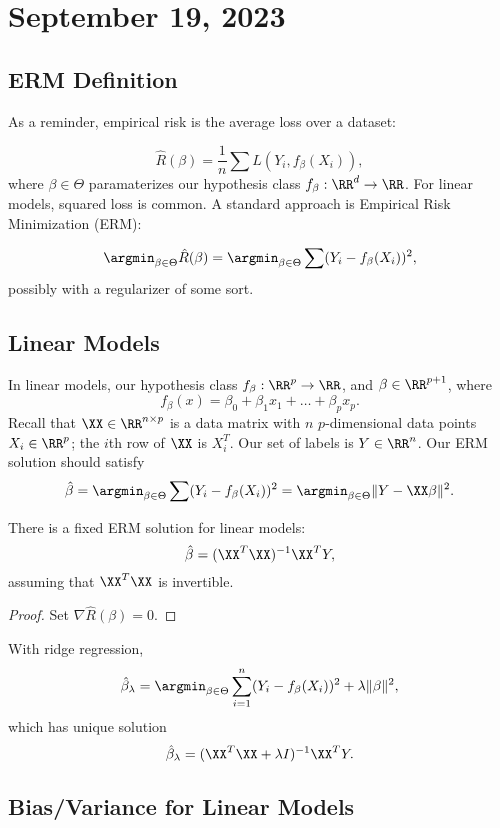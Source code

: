 \section{September 19, 2023}

\subsection{ERM Definition}

As a reminder, \ac{empirical risk} is the average loss over a dataset: 

\[\hat{R}(\beta) = \frac{1}{n}\sum L(Y_i, f_{\beta}(X_i)),\]
where $\beta\in \Theta$ paramaterizes our hypothesis class $f_{\beta}: \RR^d\rightarrow \RR$. For linear models, squared loss is common. A standard approach is Empirical Risk Minimization (ERM): 

\[\argmin_{\beta\in \Theta} \hat{R}(\beta) = \argmin_{\beta\in \Theta}\sum (Y_i - f_{\beta}(X_i))^2,\] 
possibly with a regularizer of some sort. 

\subsection{Linear Models}

In linear models, our hypothesis class $f_{\beta}: \RR^p\rightarrow \RR$, and $\beta\in \RR^{p+1}$, where 
\[f_{\beta}(x) = \beta_0 + \beta_1x_1 + \hdots + \beta_px_p.\]
Recall that $\XX\in \RR^{n\times p}$ is a data matrix with $n$ $p$-dimensional data points $X_i\in \RR^{p}$; the $i$th row of $\XX$ is $X_i^T$. Our set of labels is $Y\in \RR^n$. Our ERM solution should satisfy
\[\hat{\beta} = \argmin_{\beta\in \Theta}\sum (Y_i - f_{\beta}(X_i))^2 = \argmin_{\beta\in \Theta}\lVert Y-\XX \beta\rVert^2.\] 
\begin{theorem}
\thmlabel

There is a fixed ERM solution for linear models: 
\[\hat{\beta} = (\XX^T\XX)^{-1}\XX^TY,\]
assuming that $\XX^T\XX$ is invertible.
\end{theorem}
\begin{proof}
	Set $\nabla \hat{R}(\beta) = 0$. 
\end{proof}

With ridge regression, 
\[\hat{\beta}_{\lambda} = \argmin_{\beta\in \Theta}\sum_{i=1}^n (Y_i-f_{\beta}(X_i))^2 + \lambda \lVert \beta\rVert^2,\] 
which has unique solution 
\[\hat{\beta}_{\lambda} = (\XX^T\XX + \lambda I)^{-1}\XX^TY.\]

\subsection{Bias/Variance for Linear Models}

